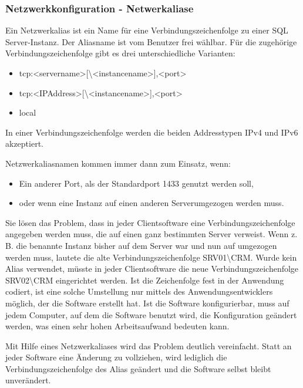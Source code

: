         \subsubsection{Netzwerkkonfiguration - Netwerkaliase}
        Ein Netzwerkalias ist ein Name für eine Verbindungszeichenfolge zu einer
        SQL Server-Instanz. Der Aliasname ist vom Benutzer frei wählbar. Für die
        zugehörige Verbindungszeichenfolge gibt es drei unterschiedliche
        Varianten:
        \begin{itemize}
            \item tcp:<servername>[\textbackslash<instancename>],<port>  
            \item tcp:<IPAddress>[\textbackslash<instancename>],<port>
            \item local 
        \end{itemize}
        \begin{merke}
          In einer Verbindungszeichenfolge werden die beiden Addresstypen IPv4
          und IPv6 akzeptiert.
        \end{merke}
        Netzwerkaliasnamen kommen immer dann zum Einsatz, wenn:
        \begin{itemize}
            \item Ein anderer Port, als der Standardport 1433 genutzt werden soll,
            \item oder wenn eine Instanz auf einen anderen Serverumgezogen
            werden muss.
        \end{itemize}
        Sie lösen das Problem, dass in jeder Clientsoftware eine
        Verbindungszeichenfolge angegeben werden muss, die auf einen ganz
        bestimmten Server verweist. Wenn z. B. die benannte Instanz
         bisher auf dem Server  war und nun
        auf  umgezogen werden muss, lautete die alte
        Verbindungszeichenfolge SRV01\textbackslash CRM. Wurde kein Alias
        verwendet, müsste in jeder Clientsoftware die neue
        Verbindungszeichenfolge SRV02\textbackslash CRM eingerichtet werden. Ist
        die Zeichenfolge fest in der Anwendung codiert, ist eine solche
        Umstellung nur mittels des Anwendungsentwicklers möglich, der die
        Software erstellt hat. Ist die Software konfigurierbar, muss auf jedem
        Computer, auf dem die Software benutzt wird, die Konfiguration geändert
        werden, was einen sehr hohen Arbeitsaufwand bedeuten kann.
        
        Mit Hilfe eines Netzwerkaliases wird das Problem deutlich vereinfacht.
        Statt an jeder Software eine Änderung zu vollziehen, wird lediglich die
        Verbindungszeichenfolge des Alias geändert und die Software selbst
        bleibt unverändert.

